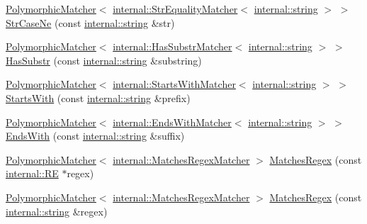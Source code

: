 \begin{DoxyCompactItemize}
\item 
\hyperlink{classtesting_1_1_polymorphic_matcher}{Polymorphic\+Matcher}$<$ \hyperlink{classtesting_1_1internal_1_1_str_equality_matcher}{internal\+::\+Str\+Equality\+Matcher}$<$ \hyperlink{namespacetesting_1_1internal_a8e8ff5b11e64078831112677156cb111}{internal\+::string} $>$ $>$ \hyperlink{namespacetesting_a9596fd67bdd5df195bc54382f91a1906}{Str\+Case\+Ne} (const \hyperlink{namespacetesting_1_1internal_a8e8ff5b11e64078831112677156cb111}{internal\+::string} \&str)
\item 
\hyperlink{classtesting_1_1_polymorphic_matcher}{Polymorphic\+Matcher}$<$ \hyperlink{classtesting_1_1internal_1_1_has_substr_matcher}{internal\+::\+Has\+Substr\+Matcher}$<$ \hyperlink{namespacetesting_1_1internal_a8e8ff5b11e64078831112677156cb111}{internal\+::string} $>$ $>$ \hyperlink{namespacetesting_a7d27682e38d57eea81ba145a2772e1c7}{Has\+Substr} (const \hyperlink{namespacetesting_1_1internal_a8e8ff5b11e64078831112677156cb111}{internal\+::string} \&substring)
\item 
\hyperlink{classtesting_1_1_polymorphic_matcher}{Polymorphic\+Matcher}$<$ \hyperlink{classtesting_1_1internal_1_1_starts_with_matcher}{internal\+::\+Starts\+With\+Matcher}$<$ \hyperlink{namespacetesting_1_1internal_a8e8ff5b11e64078831112677156cb111}{internal\+::string} $>$ $>$ \hyperlink{namespacetesting_ae0502232432b1fe8361d296c6de6beda}{Starts\+With} (const \hyperlink{namespacetesting_1_1internal_a8e8ff5b11e64078831112677156cb111}{internal\+::string} \&prefix)
\item 
\hyperlink{classtesting_1_1_polymorphic_matcher}{Polymorphic\+Matcher}$<$ \hyperlink{classtesting_1_1internal_1_1_ends_with_matcher}{internal\+::\+Ends\+With\+Matcher}$<$ \hyperlink{namespacetesting_1_1internal_a8e8ff5b11e64078831112677156cb111}{internal\+::string} $>$ $>$ \hyperlink{namespacetesting_aec11c4e418a835ca2c0c3cbdb29b28ba}{Ends\+With} (const \hyperlink{namespacetesting_1_1internal_a8e8ff5b11e64078831112677156cb111}{internal\+::string} \&suffix)
\item 
\hyperlink{classtesting_1_1_polymorphic_matcher}{Polymorphic\+Matcher}$<$ \hyperlink{classtesting_1_1internal_1_1_matches_regex_matcher}{internal\+::\+Matches\+Regex\+Matcher} $>$ \hyperlink{namespacetesting_a4dac232f315edc259b62ce88e413b107}{Matches\+Regex} (const \hyperlink{classtesting_1_1internal_1_1_r_e}{internal\+::\+RE} $\ast$regex)
\item 
\hyperlink{classtesting_1_1_polymorphic_matcher}{Polymorphic\+Matcher}$<$ \hyperlink{classtesting_1_1internal_1_1_matches_regex_matcher}{internal\+::\+Matches\+Regex\+Matcher} $>$ \hyperlink{namespacetesting_afea6e0eaf0ae69b409fc1c0285df6c8c}{Matches\+Regex} (const \hyperlink{namespacetesting_1_1internal_a8e8ff5b11e64078831112677156cb111}{internal\+::string} \&regex)

\end{DoxyCompactItemize}
